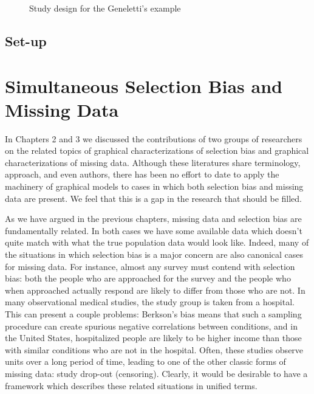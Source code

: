 \documentclass[12pt,twoside]{reedthesis}
\theoremstyle{definition}
\begin{document}
\begin{figure}[H]
\begin{center}
\end{center}
\caption{Study design for the Geneletti's example}
\end{figure}



\section{Set-up}


\chapter{Simultaneous Selection Bias and Missing Data}
In Chapters 2 and 3 we discussed the contributions of two groups of researchers on the related topics of graphical characterizations of selection bias and  graphical characterizations of missing data. Although these literatures share terminology, approach, and even authors, there has been no effort to date to apply the machinery of graphical models to cases in which both selection bias and missing data are present. We feel that this is a gap in the research that should be filled. 


As we have argued in the previous chapters, missing data and selection bias are fundamentally related. In both cases we have some available data which doesn't quite match with what the true population data would look like. Indeed, many of the situations in which selection bias is a major concern are also canonical cases for missing data. For instance, almost any survey must contend with selection bias: both the people who are approached for the survey and the people who when approached actually respond are likely to differ from those who are not. In many observational medical studies, the study group is taken from a hospital. This can present a couple problems: Berkson's bias means that such a sampling procedure can create spurious negative correlations between conditions, and in the United States, hospitalized people are likely to be higher income than those with similar conditions who are not in the hospital. Often, these studies observe units over a long period of time, leading to one of the other classic forms of missing data: study drop-out (censoring). Clearly, it would be desirable to have a framework which describes these related situations in unified terms.
\end{document}
